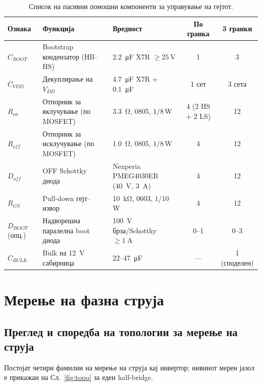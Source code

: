 \documentclass[journal,onecolumn,11pt]{IEEEtran}
\begin{document}
\begin{table}[t]
\centering
\caption{Список на пасивни помошни компоненти за управување на гејтот.}
\label{tab:gatebom}
\small
\begin{tabularx}{\columnwidth}{@{}l L L c c@{}}
\toprule
\textbf{Ознака} & \textbf{Функција} & \textbf{Вредност} & \textbf{По гранка} & \textbf{3 гранки} \\
\midrule
$C_{BOOT}$ & Bootstrap кондензатор (HB--HS) & \SI{2.2}{\micro\farad} X7R $\ge\SI{25}{\volt}$ & 1 & 3 \\
$C_{VDD}$ & Декуплирање на $V_{DD}$ & \SI{4.7}{\micro\farad} X7R $+$ \SI{0.1}{\micro\farad} & 1 сет & 3 сета \\
$R_{on}$ & Отпорник за вклучување (по MOSFET) & \SI{3.3}{\ohm}, 0805, $1/8$\,W & 4 (2 HS $+$ 2 LS) & 12 \\
$R_{off}$ & Отпорник за исклучување (по MOSFET) & \SI{1.0}{\ohm}, 0805, $1/8$\,W & 4 & 12 \\
$D_{off}$ & OFF Schottky диода & Nexperia PMEG4030ER (\SI{40}{\volt}, \SI{3}{\ampere}) & 4 & 12 \\
$R_{GS}$ & Pull-down гејт--извор & \SI{10}{\kilo\ohm}, 0603, $1/10$\,W & 4 & 12 \\
$D_{BOOT}$ (опц.) & Надворешна паралелна boot диода & \SI{100}{\volt} брза/Schottky $\ge\SI{1}{\ampere}$ & 0--1 & 0--3 \\
$C_{BULK}$ & Bulk на \SI{12}{\volt} сабирница & \mbox{22--\SI{47}{\micro\farad}} & --- & 1 (споделен) \\
\bottomrule
\end{tabularx}
\end{table}

\section{Мерење на фазна струја}\label{sec:current}

\subsection{Преглед и споредба на топологии за мерење на струја}\label{sec:csurvey}
Постојат четири фамилии на мерење на струја кај инвертор; нивниот мерен јазол е
прикажан на Сл.~\ref{fig:topo} за еден half-bridge.
\end{document}
